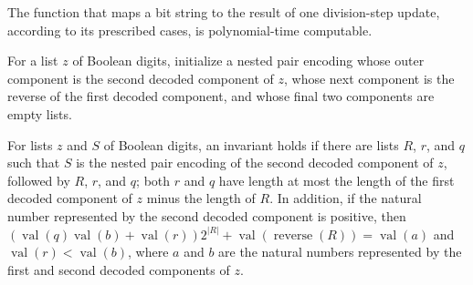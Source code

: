 \begin{theorem}
\label{Complexity.BinArith.polyTimeComputable_divStep}
\leanok
{}
The function that maps a bit string to the result of one division-step update, according
to its prescribed cases, is polynomial-time computable.
\end{theorem}

\begin{definition}
\label{Complexity.BinArith.divInit}
\leanok
{}
For a list $z$ of Boolean digits, initialize a nested pair encoding whose outer
component is the second decoded component of $z$, whose next component is the reverse of
the first decoded component, and whose final two components are empty lists.
\end{definition}

\begin{definition}
\label{Complexity.BinArith.DivInv}
\leanok
{}
For lists $z$ and $S$ of Boolean digits, an invariant holds if there are lists $R$, $r$,
and $q$ such that $S$ is the nested pair encoding of the second decoded component of
$z$, followed by $R$, $r$, and $q$; both $r$ and $q$ have length at most the length of
the first decoded component of $z$ minus the length of $R$. In addition, if the natural
number represented by the second decoded component is positive, then
$(\operatorname{val}(q)\operatorname{val}(b)+\operatorname{val}(r))2^{|R|}+\operatorname{val}(\operatorname{reverse}(R))=\operatorname{val}(a)$
and $\operatorname{val}(r)<\operatorname{val}(b)$, where $a$ and $b$ are the natural
numbers represented by the first and second decoded components of $z$.
\end{definition}

